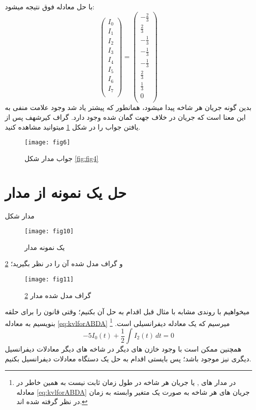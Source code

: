 با حل معادله فوق نتیجه میشود:
\begin{equation}
	\begin{pmatrix}
		I_0\\
		I_1\\
		I_2\\
		I_3\\
		I_4\\
		I_5\\
		I_6\\
		I_7\\
	\end{pmatrix}
	=
	\begin{pmatrix}
		-\frac{2}{3}\\
		\frac{2}{3}\\
		-\frac{1}{3}\\
		-\frac{1}{3}\\
		-\frac{1}{3}\\
		\frac{2}{3}\\
		\frac{1}{3}\\
		0\\
	\end{pmatrix}
\end{equation}
بدین گونه جریان هر شاخه پیدا میشود، همانطور که پیشتر یاد شد وجود علامت منفی به این 
معنا است که جریان در خلاف جهت گمان شده وجود دارد.
گراف کیرشهف پس از یافتن جواب را در شکل
\ref{fig:fig6}
میتوانید مشاهده کنید.
\begin{figure}[ht]
	\centerline{\texttt{[image: fig6]}}
	\caption{جواب مدار شکل
		\ref{fig:fig4}	
	}
	\label{fig:fig6}
\end{figure}

\section{حل یک نمونه از مدار
	 }
مدار شکل
\begin{figure}[ht]
	\centerline{\texttt{[image: fig10]}}
	\caption{
		یک نمونه مدار
	}
	\label{fig:fig10}
\end{figure}
\ref{fig:fig10}
و گراف مدل شده آن را در نظر بگیرید؛
\begin{figure}[ht]
	\label{fig:fig11}
	\centerline{\texttt{[image: fig11]}}
	\caption{
		گراف مدل شده مدار
		\ref{fig:fig10}
	}
\end{figure}
میخواهیم با روندی مشابه با مثال قبل اقدام به حل آن بکنیم؛
وقتی قانون
را برای حلقه
بنویسیم به معادله
\ref{eq:kvlforABDA}
میرسیم که یک معادله دیفرانسیلی است.
\footnote{در مدار های 
	,
	یا
	جریان هر شاخه در طول زمان ثابت نیست به همین خاطر در معادله
	\ref{eq:kvlforABDA}
	جریان های هر شاخه به صورت یک متغیر وابسته به زمان در نظر گرفته شده اند.
}
\begin{equation}\label{eq:kvlforABDA}
	-5I_0(t) + \frac{1}{2} \int I_2(t) \,dt = 0
\end{equation}
همچنین ممکن است با وجود خازن های دیگر در شاخه های دیگر معادلات دیفرانسیل دیگری نیز موجود باشد؛
پس بایستی اقدام به حل یک دستگاه معادلات دیفرانسیل بکنیم.

